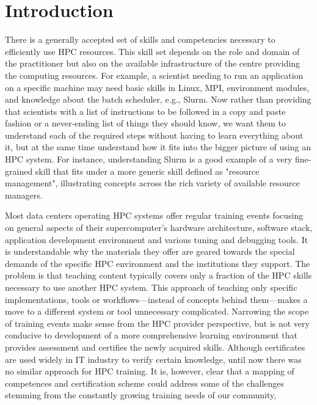 \documentclass[jocse]{jocseart}
\begin{document}
%
%
\begin{CCSXML}
\end{CCSXML}



\keywords{}

\maketitle

\section{Introduction}

There is a generally accepted set of skills and competencies necessary to efficiently use HPC resources.
This skill set depends on the role and domain of the practitioner but also on the available infrastructure of the centre providing the computing resources.
For example, a scientist needing to run an application on a specific machine may need basic skills in Linux, MPI, environment modules, and knowledge about the batch scheduler, e.g., Slurm.
Now rather than providing that scientists with a list of instructions to be followed in a copy and paste fashion or a never-ending list of things they should know, we want them to understand each of the required steps without having to learn everything about it, but at the same time understand how it fits into the bigger picture of using an HPC system.
For instance, understanding Slurm is a good example of a very fine-grained skill that fits under a more generic skill defined as "resource management", illustrating concepts across the rich variety of available resource managers.

Most data centers operating HPC systems offer regular training events focusing on general aspects of their supercomputer's hardware architecture, software stack, application development environment and various tuning and debugging tools.
It is understandable why the materials they offer are geared towards the special demands of the specific HPC environment and the institutions they support.
The problem is that teaching content typically covers only a fraction of the HPC skills necessary to use another HPC system.
This approach of teaching only specific implementations, tools or workflows---instead of concepts behind them---makes a move to a different system or tool unnecessary complicated.
Narrowing the scope of training events make sense from the HPC provider perspective, but is not very conducive to development of a more comprehensive learning environment that provides assessment and certifies the newly acquired skills.
Although certificates are used widely in IT industry to verify certain knowledge, until now there was no similar approach for HPC training.
It is, however, clear that a mapping of competences and certification scheme could address some of the challenges stemming from the constantly growing training needs of our community,
\end{document}
